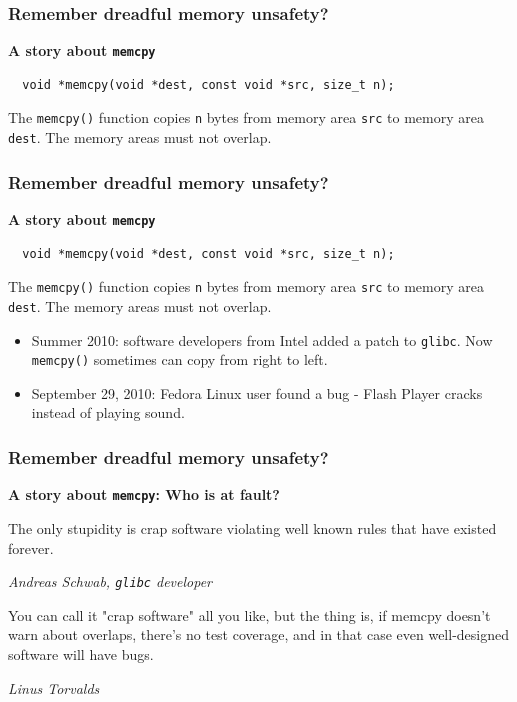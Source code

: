 \documentclass[aspectratio=1610,t]{beamer}
\begin{document}

\begin{frame}[fragile]
\frametitle{Remember dreadful memory unsafety?}
\textbf{A story about \texttt{memcpy}}

\begin{verbatim}
  void *memcpy(void *dest, const void *src, size_t n);
\end{verbatim}

The \texttt{memcpy()} function copies \texttt{n} bytes from memory area \texttt{src} to memory area \texttt{dest}. The memory areas must not overlap.

\end{frame}


\begin{frame}[fragile]
\frametitle{Remember dreadful memory unsafety?}
\textbf{A story about \texttt{memcpy}}

\begin{verbatim}
  void *memcpy(void *dest, const void *src, size_t n);
\end{verbatim}

The \texttt{memcpy()} function copies \texttt{n} bytes from memory area \texttt{src} to memory area \texttt{dest}. The memory areas must not overlap.

\begin{itemize}
    \item Summer 2010: software developers from Intel added a patch to \texttt{glibc}. Now \texttt{memcpy()} sometimes can copy from right to left.
    \item September 29, 2010: Fedora Linux user found a bug - Flash Player cracks instead of playing sound.
\end{itemize}

\end{frame}


\begin{frame}[fragile]
\frametitle{Remember dreadful memory unsafety?}
\textbf{A story about \texttt{memcpy}: Who is at fault?}

The only stupidity is crap software violating well known rules that have existed forever.
\begin{flushright}
    \textit{Andreas Schwab, \texttt{glibc} developer}
\end{flushright}

You can call it "crap software" all you like, but the thing is, if memcpy doesn't warn about overlaps, there's no test coverage, and in that case even well-designed software will have bugs.
\begin{flushright}
    \textit{Linus Torvalds}
\end{flushright}

\end{frame}
\end{document}
